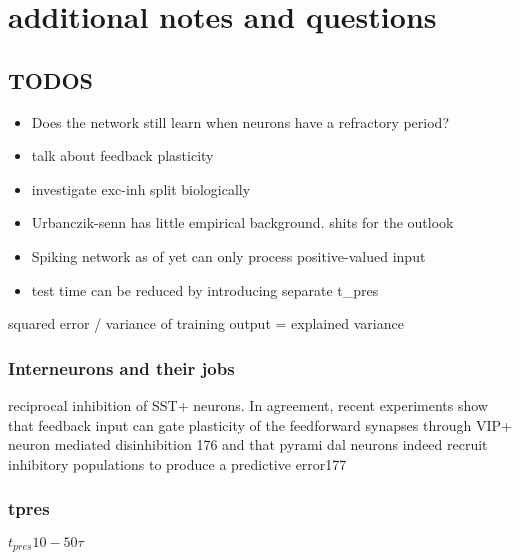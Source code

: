 \chapter{additional notes and questions}

\section{TODOS}

\begin{itemize}
    \item Does the network still learn when neurons have a refractory period?
    \item talk about feedback plasticity
    \item investigate exc-inh split biologically
    \item Urbanczik-senn has little empirical background. shits for the outlook
    \item Spiking network as of yet can only process positive-valued input
    \item test time can be reduced by introducing separate t\_pres
\end{itemize}

squared error / variance of training output = explained variance

\subsection{Interneurons and their jobs}




reciprocal inhibition of SST+ neurons. In agreement,
recent experiments show that feedback input can gate
plasticity of the feedforward synapses through VIP+
neuron mediated disinhibition 176 and that pyrami
dal neurons indeed recruit inhibitory populations to
produce a predictive error177 \citep{Poirazi2020}

\subsection{tpres}

$t_{pres} 10 - 50 \tau$
